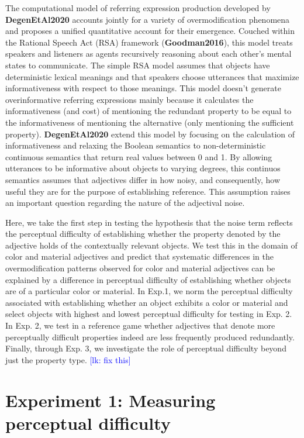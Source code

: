 \documentclass[12pt,letterpaper]{article}
\newcommand{\lk}[1]{\textcolor{Blue}{[lk: #1]}}
\newcommand{\citeA}{\textbf}
\begin{document}
The computational model of referring expression production developed by \citeA{DegenEtAl2020} accounts jointly for a variety of overmodification phenomena and proposes a unified quantitative account for their emergence. Couched within the Rational Speech Act (RSA) framework (\citeA{Goodman2016}), this model treats speakers and listeners as agents recursively reasoning about each other's mental states to communicate. The simple RSA model assumes that objects have deterministic lexical meanings and that speakers choose utterances that maximize informativeness with respect to those meanings. This model doesn't generate overinformative referring expressions mainly because it calculates the informativeness (and cost) of mentioning the redundant property to be equal to the informativeness of mentioning the alternative (only mentioning the sufficient property). \citeA{DegenEtAl2020} extend this model by focusing on the calculation of informativeness and relaxing the Boolean semantics to non-deterministic continuous semantics that return real values between 0 and 1. By allowing utterances to be informative about objects to varying degrees, this continuos semantics assumes that adjectives differ in how noisy, and consequently, how useful they are for the purpose of establishing reference. This assumption raises an important question regarding the nature of the adjectival noise. 

Here, we take the first step in testing the hypothesis that the noise term reflects the perceptual difficulty of establishing whether the property denoted by the adjective holds of the contextually relevant objects. We test this in the domain of color and material adjectives and predict that systematic differences in the overmodification patterns observed for color and material adjectives can be explained by a difference in perceptual difficulty of establishing whether objects are of a particular color or material. In Exp.1, we norm the perceptual difficulty associated with establishing whether an object exhibits a color or material and select objects with highest and lowest perceptual difficulty for testing in Exp. 2. In Exp. 2, we test in a reference game whether adjectives that denote more perceptually difficult properties indeed are less frequently produced redundantly. Finally, through Exp. 3, we investigate the role of perceptual difficulty beyond just the property type. \lk{fix this}

\section{Experiment 1: Measuring perceptual difficulty} 
\end{document}
